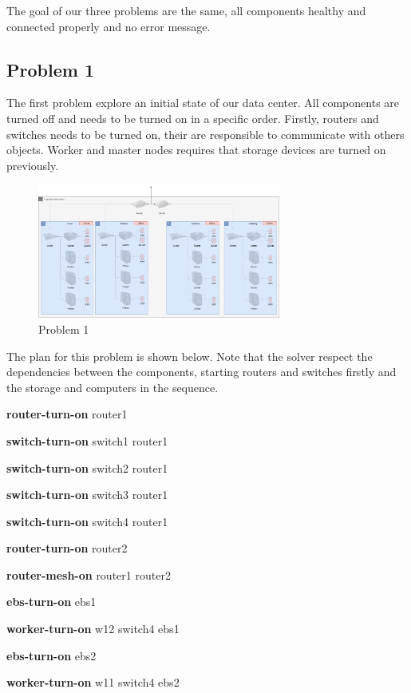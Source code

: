 \documentclass[letterpaper]{article}
\begin{document}
The goal of our three problems are the same, all components healthy and connected properly and no error message.

\subsection{Problem 1}\label{sec:experiments1}

The first problem explore an initial state of our data center. All components are turned off and needs to be turned on in a specific order. Firstly, routers and switches needs to be turned on, their are responsible to communicate with others objects. Worker and master nodes requires that storage devices are turned on previously.

\begin{figure}[ht]
    \centering
    \includegraphics[width=8cm]{images/diagrams-pb1.png}
    \caption{Problem 1}
    \label{fig:data-center-pb1}
\end{figure}

The plan for this problem is shown below. Note that the solver respect the dependencies between the components, starting routers and switches firstly and the storage and computers in the sequence.

\textbf{router-turn-on} router1 

\textbf{switch-turn-on} switch1 router1 

\textbf{switch-turn-on} switch2 router1 

\textbf{switch-turn-on} switch3 router1 

\textbf{switch-turn-on} switch4 router1 

\textbf{router-turn-on} router2 

\textbf{router-mesh-on} router1 router2 

\textbf{ebs-turn-on} ebs1 

\textbf{worker-turn-on} w12 switch4 ebs1 

\textbf{ebs-turn-on} ebs2 

\textbf{worker-turn-on} w11 switch4 ebs2 
\end{document}
